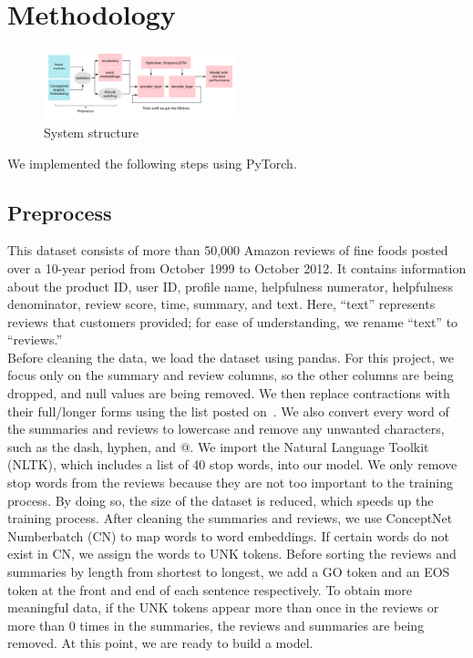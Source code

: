 \documentclass[conference]{IEEEtran}
\begin{document}
\section{Methodology}
\begin{figure}[h]
\centering
\includegraphics[width=0.5\textwidth]{imgs/System_Structure.png}
\caption{System structure}
\label{fig:System_Structure}
\end{figure}
\begin{flushleft} 
We implemented the following steps using PyTorch.
\end{flushleft}
\subsection{Preprocess}
This dataset consists of more than 50,000 Amazon reviews of fine foods posted over a 10-year period from October 1999 to October 2012. It contains information about the product ID, user ID, profile name, helpfulness numerator, helpfulness denominator, review score, time, summary, and text. Here, “text” represents reviews that customers provided; for ease of understanding, we rename “text” to “reviews.” \\
\indent Before cleaning the data, we load the dataset using pandas. For this project, we focus only on the summary and review columns, so the other columns are being dropped, and null values are being removed. We then replace contractions with their full/longer forms using the list posted on~\cite{unknown1}. We also convert every word of the summaries and reviews to lowercase and remove any unwanted characters, such as the dash, hyphen, and @. We import the Natural Language Toolkit (NLTK), which includes a list of 40 stop words, into our model. We only remove stop words from the reviews because they are not too important to the training process. By doing so, the size of the dataset is reduced, which speeds up the training process. After cleaning the summaries and reviews, we use ConceptNet Numberbatch (CN) to map words to word embeddings. If certain words do not exist in CN, we assign the words to UNK tokens. Before sorting the reviews and summaries by length from shortest to longest, we add a GO token and an EOS token at the front and end of each sentence respectively. To obtain more meaningful data, if the UNK tokens appear more than once in the reviews or more than 0 times in the summaries, the reviews and summaries are being removed. At this point, we are ready to build a model.
\end{document}
